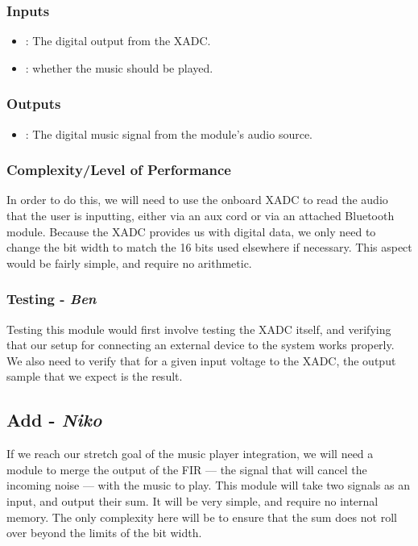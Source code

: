 \documentclass{fpgairpods}
\begin{document}
\begin{multicols*}{2}
\subsubsection{Inputs}
\begin{itemize}
    \item {}: The digital output from the XADC.
    \item {}: whether the music should be played.
\end{itemize}
\subsubsection{Outputs}
\begin{itemize}
    \item {}: The digital music signal from the module's audio source. 
\end{itemize}
\subsubsection{Complexity/Level of Performance}
In order to do this, we will need to use the onboard XADC to read the audio that the user is inputting, either via an aux cord or via an attached Bluetooth module. Because the XADC provides us with digital data, we only need to change the bit width to match the 16 bits used elsewhere if necessary. This aspect would be fairly simple, and require no arithmetic. 
\subsubsection{Testing - \textit{Ben}}
Testing this module would first involve testing the XADC itself, and verifying that our setup for connecting an external device to the system works properly. We also need to verify that for a given input voltage to the XADC, the output sample that we expect is the result.

\subsection{Add - \textit{Niko}}
If we reach our stretch goal of the music player integration, we will need a module to merge the output of the FIR --- the signal that will cancel the incoming noise --- with the music to play. This module will take two signals as an input, and output their sum. It will be very simple, and require no internal memory. The only complexity here will be to ensure that the sum does not roll over beyond the limits of the bit width.

\end{multicols*}
\end{document}
